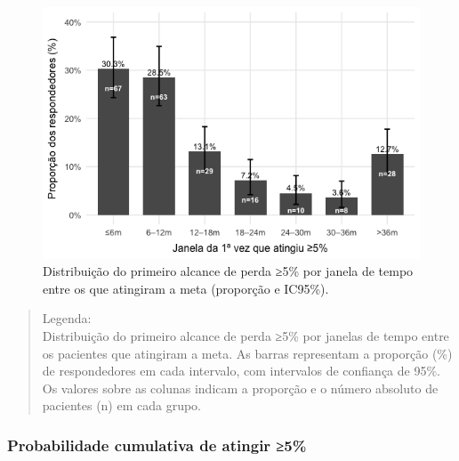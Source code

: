 \documentclass[
]{article}
\begin{document}
\begin{figure}[H]

{\centering \includegraphics[width=1\textwidth,height=\textheight]{outputs/figs/grafico-atingiu-por-janela-1.png}

}

\caption{Distribuição do primeiro alcance de perda ≥5\% por janela de
tempo entre os que atingiram a meta (proporção e IC95\%).}

\end{figure}%

\begin{quote}
Legenda:\\
Distribuição do primeiro alcance de perda ≥5\% por janelas de tempo
entre os pacientes que atingiram a meta. As barras representam a
proporção (\%) de respondedores em cada intervalo, com intervalos de
confiança de 95\%. Os valores sobre as colunas indicam a proporção e o
número absoluto de pacientes (n) em cada grupo.
\end{quote}

\subsubsection{Probabilidade cumulativa de atingir
≥5\%}\label{probabilidade-cumulativa-de-atingir-5}
\end{document}
